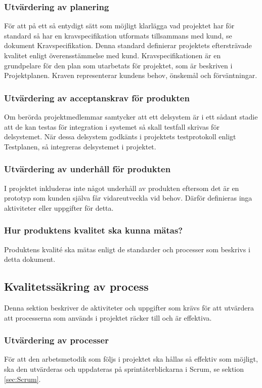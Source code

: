 \documentclass[a4paper,10pt]{article}
\begin{document}
\subsubsection{Utvärdering av planering}
För att på ett så entydigt sätt som möjligt klarlägga vad projektet har för standard så har en kravspecifikation utformats tillsammans med kund, se dokument Kravspecifikation.
Denna standard definierar projektets eftersträvade kvalitet enligt överensstämmelse med kund.
Kravspecifikationen är en grundpelare för den plan som utarbetats för projektet, som är beskriven i Projektplanen. Kraven representerar kundens behov, önskemål och förväntningar.
\subsubsection{Utvärdering av acceptanskrav för produkten}
Om berörda projektmedlemmar samtycker att ett delsystem är i ett sådant stadie att de kan testas för integration i systemet så skall testfall skrivas för delsystemet. När dessa delsystem godkänts i projektets testprotokoll enligt Testplanen, så integreras delsystemet i projektet.
\subsubsection{Utvärdering av underhåll för produkten}
I projektet inkluderas inte något underhåll av produkten eftersom det är en prototyp som kunden själva får vidareutveckla vid behov. Därför definieras inga aktiviteter eller uppgifter för detta.
\subsubsection{Hur produktens kvalitet ska kunna mätas?}
Produktens kvalité ska mätas enligt de standarder och processer som beskrivs i detta dokument.
\subsection{Kvalitetssäkring av process}
Denna sektion beskriver de aktiviteter och uppgifter som krävs för att utvärdera att processerna som används i projektet räcker till och är effektiva.

\subsubsection{Utvärdering av processer}
För att den arbetsmetodik som följs i projektet ska hållas så effektiv som möjligt, ska den utvärderas och uppdateras på sprintåterblickarna i Scrum, se sektion \ref{sec:Scrum}.
\end{document}

